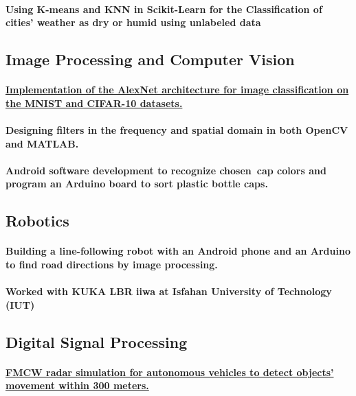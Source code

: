 \documentclass[a4paper]{article}
\begin{document}
            \paragraph{Using K-means and KNN in Scikit-Learn for the Classification of cities’ weather as dry or humid using unlabeled data}

        \subsection{Image Processing and Computer Vision}

            \paragraph{\href{https://github.com/ake1999/CNN_AlexNet}{Implementation of the AlexNet architecture for image classification on the MNIST and CIFAR-10 datasets.}}
            \paragraph{Designing filters in the frequency and spatial domain in both OpenCV and MATLAB.}
            \paragraph{Android software development to recognize chosen cap colors and program an Arduino board to sort plastic bottle caps.}

        \subsection{Robotics}

            \paragraph{Building a line-following robot with an Android phone and an Arduino to find road directions by image processing.}
            \paragraph{Worked with KUKA LBR iiwa at Isfahan University of Technology (IUT)}
        \subsection{Digital Signal Processing}
            \paragraph{\href{https://github.com/ake1999/FMCW_Radar_Ake}{FMCW radar simulation for autonomous vehicles to detect objects' movement within 300 meters.}}
\end{document}
